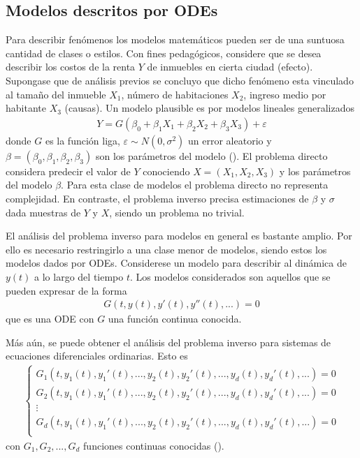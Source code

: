 \subsection*{Modelos descritos por ODEs}

Para describir fenómenos los modelos matemáticos pueden ser de una suntuosa cantidad de clases o estilos. Con fines pedagógicos, considere que se desea describir los costos de la renta $Y$ de inmuebles en cierta ciudad (efecto). Supongase que de análisis previos se concluyo que dicho fenómeno esta vinculado al tamaño del inmueble $X_1$, número de habitaciones $X_2$, ingreso medio por habitante $X_3$ (causas). Un modelo plausible es por modelos lineales generalizados
\begin{align}
    Y = G(\beta_0 + \beta_1 X_1 + \beta_2 X_2 + \beta_3 X_3) + \varepsilon
    \label{2.1.1.01}
\end{align}
donde $G$ es la función liga, $\varepsilon \sim N(0,\sigma^2)$ un error aleatorio y $\beta = (\beta_0, \beta_1, \beta_2, \beta_3)$ son los parámetros del modelo (\cite{dobson2018introduction}). El problema directo considera predecir el valor de $Y$ conociendo $X = (X_1,X_2,X_3)$ y los parámetros del modelo $\beta$. Para esta clase de modelos el problema directo no representa complejidad. En contraste, el problema inverso precisa estimaciones de $\beta$  y $\sigma$ dada muestras de $Y$ y $X$, siendo un problema no trivial. 

El análisis del problema inverso para modelos en general es bastante amplio. Por ello es necesario restringirlo a una clase menor de modelos, siendo estos los modelos dados por ODEs. Considerese un modelo para describir al dinámica de $y(t)$ a lo largo del tiempo $t$. Los modelos considerados son aquellos que se pueden expresar de la forma
\begin{align*}
    G(t,y(t),y'(t),y''(t),...) = 0
\end{align*}
que es una ODE con $G$ una función continua conocida.

Más aún, se puede obtener el análisis del problema inverso para sistemas de ecuaciones diferenciales ordinarias. Esto es
\begin{align*}
    \left\{
        \begin{matrix}
        G_1(t,y_1(t),y_1'(t),...,y_2(t),y_2'(t),..., y_d(t),y_d'(t),...)=0\\
        G_2(t,y_1(t),y_1'(t),...,y_2(t),y_2'(t),..., y_d(t),y_d'(t),...)=0\\
        \vdots
        \\ 
        G_d(t,y_1(t),y_1'(t),...,y_2(t),y_2'(t),..., y_d(t),y_d'(t),...)=0\\
       \end{matrix}
    \right.
\end{align*}
con $G_1, G_2, ..., G_d$ funciones continuas conocidas (\cite{apostol2019calculus}).

